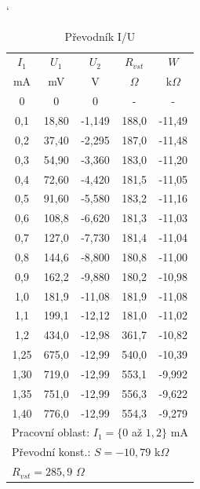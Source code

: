 \documentclass[a4paper, czech]{article}
\begin{document}
\begin{minipage}{0.48\textwidth}
    \begin{table}[H]
        \catcode`
        \centering
        \caption{Převodník I/U}
        \begin{tabular}{ccccc}
            \toprule
            $I_1$   & $U_1$    & $U_2$     & $R_{vst}$  & $W$      \\
            \cmidrule(rl){1-1}
            \cmidrule(rl){2-2}
            \cmidrule(rl){3-3}
            \cmidrule(rl){4-4}
            \cmidrule(rl){5-5}
            mA   & mV    & V      & $\Omega$     & k$\Omega$     \\
            \midrule
            0    & 0     & 0      & -     & -      \\
            0,1  & 18,80 & -1,149 & 188,0 & -11,49 \\
            0,2  & 37,40 & -2,295 & 187,0 & -11,48 \\
            0,3  & 54,90 & -3,360 & 183,0 & -11,20 \\
            0,4  & 72,60 & -4,420 & 181,5 & -11,05 \\
            0,5  & 91,60 & -5,580 & 183,2 & -11,16 \\
            0,6  & 108,8 & -6,620 & 181,3 & -11,03 \\
            0,7  & 127,0 & -7,730 & 181,4 & -11,04 \\
            0,8  & 144,6 & -8,800 & 180,8 & -11,00 \\
            0,9  & 162,2 & -9,880 & 180,2 & -10,98 \\
            1,0  & 181,9 & -11,08 & 181,9 & -11,08 \\
            1,1  & 199,1 & -12,12 & 181,0 & -11,02 \\
            1,2  & 434,0 & -12,98 & 361,7 & -10,82 \\
            1,25 & 675,0 & -12,99 & 540,0 & -10,39 \\
            1,30 & 719,0 & -12,99 & 553,1 & -9,992 \\
            1,35 & 751,0 & -12,99 & 556,3 & -9,622 \\
            1,40 & 776,0 & -12,99 & 554,3 & -9,279 \\
            \bottomrule
            \multicolumn{5}{l}{Pracovní oblast: $I_1 = \{0$ až $1,2\}$ mA} \\
            \multicolumn{5}{l}{Převodní konst.: $S = -10,79$  k$\Omega$} \\
            \multicolumn{5}{l}{$R_{vst} = 285,9$ $\Omega$} \\
        \end{tabular}
    \end{table}
\end{minipage}
\end{document}

